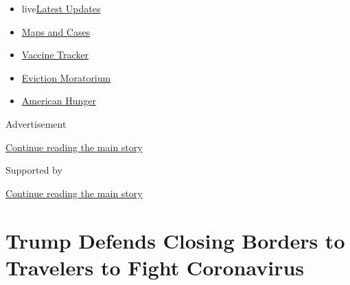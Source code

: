 \begin{itemize}
\tightlist
\item
  live\href{https://www.nytimes3xbfgragh.onion/2020/09/09/world/covid-19-coronavirus.html?name=styln-coronavirus-national\&region=TOP_BANNER\&block=storyline_menu_recirc\&action=click\&pgtype=Article\&impression_id=0b02ab20-f293-11ea-ac04-1b9516e30825\&variant=undefined}{Latest
  Updates}
\item
  \href{https://www.nytimes3xbfgragh.onion/interactive/2020/us/coronavirus-us-cases.html?name=styln-coronavirus-national\&region=TOP_BANNER\&block=storyline_menu_recirc\&action=click\&pgtype=Article\&impression_id=0b02ab21-f293-11ea-ac04-1b9516e30825\&variant=undefined}{Maps
  and Cases}
\item
  \href{https://www.nytimes3xbfgragh.onion/interactive/2020/science/coronavirus-vaccine-tracker.html?name=styln-coronavirus-national\&region=TOP_BANNER\&block=storyline_menu_recirc\&action=click\&pgtype=Article\&impression_id=0b02ab22-f293-11ea-ac04-1b9516e30825\&variant=undefined}{Vaccine
  Tracker}
\item
  \href{https://www.nytimes3xbfgragh.onion/2020/09/02/your-money/eviction-moratorium-covid.html?name=styln-coronavirus-national\&region=TOP_BANNER\&block=storyline_menu_recirc\&action=click\&pgtype=Article\&impression_id=0b02ab23-f293-11ea-ac04-1b9516e30825\&variant=undefined}{Eviction
  Moratorium}
\item
  \href{https://www.nytimes3xbfgragh.onion/interactive/2020/09/02/magazine/food-insecurity-hunger-us.html?name=styln-coronavirus-national\&region=TOP_BANNER\&block=storyline_menu_recirc\&action=click\&pgtype=Article\&impression_id=0b02d230-f293-11ea-ac04-1b9516e30825\&variant=undefined}{American
  Hunger}
\end{itemize}

Advertisement

\protect\hyperlink{after-top}{Continue reading the main story}

Supported by

\protect\hyperlink{after-sponsor}{Continue reading the main story}

\hypertarget{trump-defends-closing-borders-to-travelers-to-fight-coronavirus}{%
\section{Trump Defends Closing Borders to Travelers to Fight
Coronavirus}\label{trump-defends-closing-borders-to-travelers-to-fight-coronavirus}}

